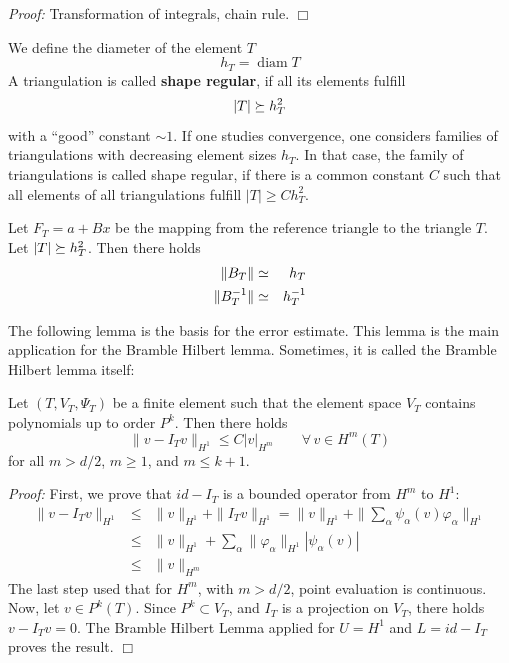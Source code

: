 {\em Proof:} Transformation of integrals, chain rule. \hfill $\Box$


\bigskip
We define the diameter of the element $T$
$$
h_T = \operatorname{diam} T 
$$
A triangulation is called {\bf shape regular}, if all its elements fulfill
$$
| T | \succeq h_T^2
$$
with a ``good'' constant $\sim 1$. If one studies convergence, one considers families
of triangulations with decreasing element sizes $h_T$. In that case, the family
of triangulations is called shape regular, if there is a common constant $C$ such that 
all elements of all triangulations fulfill $| T | \geq C h_T^2$.


\begin{lemma} Let $F_T = a + B x$ be the mapping from the reference triangle
to the triangle $T$. Let $|T| \succeq h_T^2$. Then there holds
\begin{eqnarray*}
\| B_T \| & \simeq & h_T \\
\| B_T^{-1} \| & \simeq & h_T^{-1}
\end{eqnarray*}
\end{lemma}


The following lemma is the basis for the error estimate. This lemma is the main
application for the Bramble Hilbert lemma. Sometimes, it is called 
the Bramble Hilbert lemma itself:
\begin{lemma}
Let $(T, V_T, \Psi_T)$ be a finite element such that
the element space $V_T$ contains polynomials up to order $P^k$. 
Then there holds
$$
\| v - I_T v \|_{H^1} \leq C | v |_{H^m} \qquad \forall \, v \in H^m(T)
$$
for all $m > d/2$, $m \geq 1$, and $m \leq k+1$.
\end{lemma}
{\em Proof:} First, we prove that $id - I_T$ is a bounded operator
from $H^m$ to $H^1$:
\begin{eqnarray*}
\| v - I_T v \|_{H^1} & \leq & \| v \|_{H^1} + \| I_T v \|_{H^1}
        =  \| v \|_{H^1} + \| \sum_{\alpha} \psi_\alpha(v) \varphi_\alpha \|_{H^1}
 \\
& \leq & \| v \|_{H^1} + \sum_\alpha \| \varphi_\alpha \|_{H^1} | \psi_\alpha(v) | \\
& \leq & \| v \|_{H^m}
\end{eqnarray*}
The last step used that for $H^m$, with $m > d/2$, point evaluation is continuous.
Now, let $v \in P^k(T)$. Since $P^k \subset V_T$, and $I_T$ is a projection on $V_T$, 
there holds $v - I_T v = 0$. The Bramble Hilbert Lemma applied for $U = H^1$ and
$L = id - I_T$ proves the result.
\hfill $\Box$



